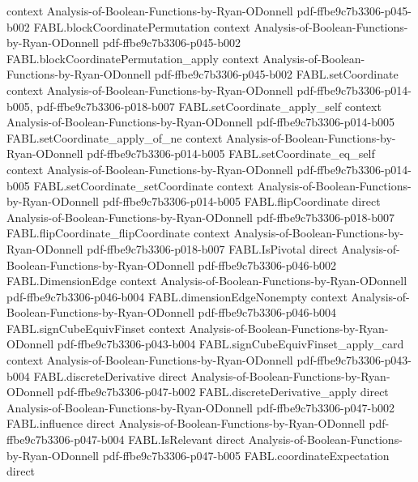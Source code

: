 \begin{theorem}
  {context}
  {Analysis-of-Boolean-Functions-by-Ryan-ODonnell}
  {pdf-ffbe9c7b3306-p045-b002}
\proofstep
  {FABL.blockCoordinatePermutation}
  {context}
  {Analysis-of-Boolean-Functions-by-Ryan-ODonnell}
  {pdf-ffbe9c7b3306-p045-b002}
\proofstep
  {FABL.blockCoordinatePermutation_apply}
  {context}
  {Analysis-of-Boolean-Functions-by-Ryan-ODonnell}
  {pdf-ffbe9c7b3306-p045-b002}
\proofstep
  {FABL.setCoordinate}
  {context}
  {Analysis-of-Boolean-Functions-by-Ryan-ODonnell}
  {pdf-ffbe9c7b3306-p014-b005,
    pdf-ffbe9c7b3306-p018-b007}
\proofstep
  {FABL.setCoordinate_apply_self}
  {context}
  {Analysis-of-Boolean-Functions-by-Ryan-ODonnell}
  {pdf-ffbe9c7b3306-p014-b005}
\proofstep
  {FABL.setCoordinate_apply_of_ne}
  {context}
  {Analysis-of-Boolean-Functions-by-Ryan-ODonnell}
  {pdf-ffbe9c7b3306-p014-b005}
\proofstep
  {FABL.setCoordinate_eq_self}
  {context}
  {Analysis-of-Boolean-Functions-by-Ryan-ODonnell}
  {pdf-ffbe9c7b3306-p014-b005}
\proofstep
  {FABL.setCoordinate_setCoordinate}
  {context}
  {Analysis-of-Boolean-Functions-by-Ryan-ODonnell}
  {pdf-ffbe9c7b3306-p014-b005}
\proofstep
  {FABL.flipCoordinate}
  {direct}
  {Analysis-of-Boolean-Functions-by-Ryan-ODonnell}
  {pdf-ffbe9c7b3306-p018-b007}
\proofstep
  {FABL.flipCoordinate_flipCoordinate}
  {context}
  {Analysis-of-Boolean-Functions-by-Ryan-ODonnell}
  {pdf-ffbe9c7b3306-p018-b007}
\proofstep
  {FABL.IsPivotal}
  {direct}
  {Analysis-of-Boolean-Functions-by-Ryan-ODonnell}
  {pdf-ffbe9c7b3306-p046-b002}
\proofstep
  {FABL.DimensionEdge}
  {context}
  {Analysis-of-Boolean-Functions-by-Ryan-ODonnell}
  {pdf-ffbe9c7b3306-p046-b004}
\proofstep
  {FABL.dimensionEdgeNonempty}
  {context}
  {Analysis-of-Boolean-Functions-by-Ryan-ODonnell}
  {pdf-ffbe9c7b3306-p046-b004}
\proofstep
  {FABL.signCubeEquivFinset}
  {context}
  {Analysis-of-Boolean-Functions-by-Ryan-ODonnell}
  {pdf-ffbe9c7b3306-p043-b004}
\proofstep
  {FABL.signCubeEquivFinset_apply_card}
  {context}
  {Analysis-of-Boolean-Functions-by-Ryan-ODonnell}
  {pdf-ffbe9c7b3306-p043-b004}
\proofstep
  {FABL.discreteDerivative}
  {direct}
  {Analysis-of-Boolean-Functions-by-Ryan-ODonnell}
  {pdf-ffbe9c7b3306-p047-b002}
\proofstep
  {FABL.discreteDerivative_apply}
  {direct}
  {Analysis-of-Boolean-Functions-by-Ryan-ODonnell}
  {pdf-ffbe9c7b3306-p047-b002}
\proofstep
  {FABL.influence}
  {direct}
  {Analysis-of-Boolean-Functions-by-Ryan-ODonnell}
  {pdf-ffbe9c7b3306-p047-b004}
\proofstep
  {FABL.IsRelevant}
  {direct}
  {Analysis-of-Boolean-Functions-by-Ryan-ODonnell}
  {pdf-ffbe9c7b3306-p047-b005}
\proofstep
  {FABL.coordinateExpectation}
  {direct}

\end{theorem}
